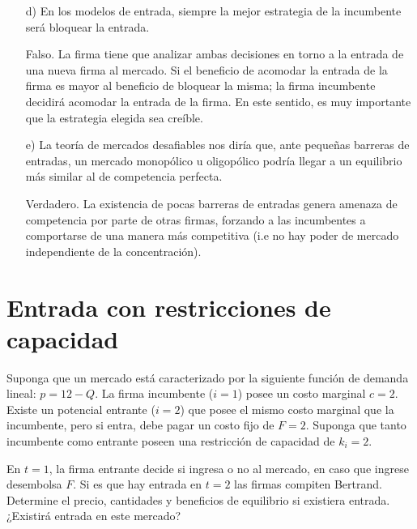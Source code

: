 \documentclass{exam}
\begin{document}
\begin{itemize}
\item[d)] En los modelos de entrada, siempre la mejor estrategia de la incumbente será bloquear la entrada.
\begin{solution}
    Falso. La firma tiene que analizar ambas decisiones en torno a la entrada de una nueva firma al mercado. Si el beneficio de acomodar la entrada de la firma es mayor al beneficio de bloquear la misma; la firma incumbente decidirá acomodar la entrada de la firma. En este sentido, es muy importante que la estrategia elegida sea creíble.
\end{solution}

\item[e)] La teoría de mercados desafiables nos diría que, ante pequeñas barreras de entradas, un mercado monopólico u oligopólico podría llegar a un equilibrio más similar al de competencia perfecta.

\begin{solution}
    Verdadero. La existencia de pocas barreras de entradas genera amenaza de competencia por parte de otras firmas, forzando a las incumbentes a comportarse de una manera más competitiva (i.e no hay poder de mercado independiente de la concentración).
\end{solution}


\end{itemize}

\section{Entrada con restricciones de capacidad}

Suponga que un mercado está caracterizado por la siguiente función de demanda lineal: \(p = 12 - Q\). La firma incumbente ($i = 1$) posee un costo marginal $c = 2$. Existe un potencial entrante ($i = 2$) que posee el mismo costo marginal que la incumbente, pero si entra, debe pagar un costo fijo de \(F = 2\). Suponga que tanto incumbente como entrante poseen una restricción de capacidad de \(k_i = 2\). \vspace{3mm}

En \(t = 1\), la firma entrante decide si ingresa o no al mercado, en caso que ingrese desembolsa \(F\). Si es que hay entrada en \(t = 2\) las firmas compiten Bertrand. Determine el precio, cantidades y beneficios de equilibrio si existiera entrada. ¿Existirá entrada en este mercado?
\end{document}
